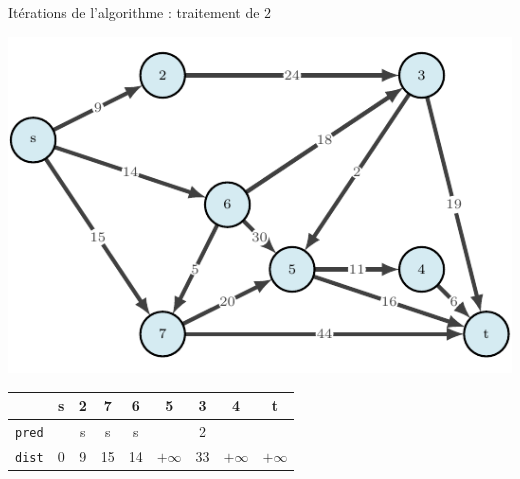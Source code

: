 \begin{frame}{Itérations de l'algorithme : traitement de $2$}
    \begin{center}
        \includegraphics[height=.6\textheight]{fig/dijkstra-0.pdf}      
    \begin{tabular}{c|cccccccc}
      
        & \textbf{s}   &\textbf{2}     &7      &6      &5      &3      &4      &t      \\
        \hline
        \texttt{pred} & &s      &s      &s      &       &2      &       &       \\
        \texttt{dist} & 0       &9      &15     &14     &$+\infty$    &33     &$+\infty$    &$+\infty$    \\
                   \end{tabular}
\end{center}
\end{frame}

